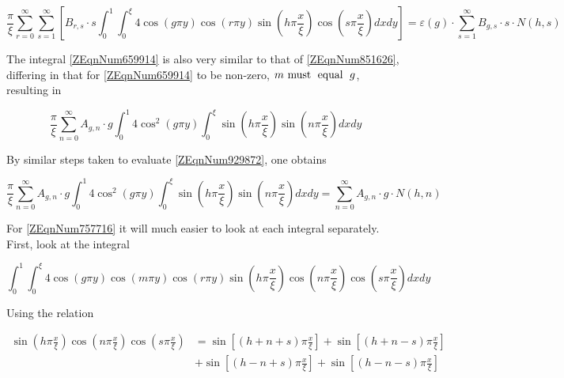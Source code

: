 \documentclass{article}
\begin{document}
\begin{equation} \label{3.30)} \frac{\pi }{\xi } \sum _{r=0}^{\infty } \sum
_{s=1}^{\infty } \left[B_{r,s} \cdot s\int _{0}^{1} \int _{0}^{\xi }4\cos
\left(g\pi y\right)\cos (r\pi y)\sin \left(h\pi \frac{x}{\xi } \right)\cos
\left(s\pi \frac{x}{\xi } \right)dxdy \right] =\varepsilon \left(g\right)\cdot
\sum _{s=1}^{\infty }B_{g,s} \cdot s\cdot N\left(h,s\right) \end{equation}

The integral \eqref{ZEqnNum659914} is also very similar to that of
\eqref{ZEqnNum851626}, differing in that for \eqref{ZEqnNum659914} to be
non-zero, $m \text{ must\; equal\; } g$, resulting in

\begin{equation} \label{3.31)} \frac{\pi }{\xi } \sum _{n=0}^{\infty }A_{g,n}
\cdot g\int _{0}^{1}4\cos ^{2} \left(g\pi y\right)\int _{0}^{\xi } \sin
\left(h\pi \frac{x}{\xi } \right)\sin \left(n\pi \frac{x}{\xi } \right) dxdy
\end{equation}

By similar steps taken to evaluate \eqref{ZEqnNum929872}, one obtains

\begin{equation} \label{3.32)} \frac{\pi }{\xi } \sum _{n=0}^{\infty }A_{g,n}
\cdot g\int _{0}^{1}4\cos ^{2} \left(g\pi y\right)\int _{0}^{\xi } \sin
\left(h\pi \frac{x}{\xi } \right)\sin \left(n\pi \frac{x}{\xi } \right)
dxdy=\sum _{n=0}^{\infty }A_{g,n} \cdot g\cdot N\left(h,n\right) \end{equation} 



For \eqref{ZEqnNum757716} it will much easier to look at each integral
separately. First, look at the integral

\begin{equation*}
    \int _{0}^{1} \int _{0}^{\xi }4\cos \left(g\pi y\right)\cos \left(m\pi
    y\right)\cos \left(r\pi y\right)\sin \left(h\pi \frac{x}{\xi } \right)\cos
    \left(n\pi \frac{x}{\xi } \right)\cos \left(s\pi \frac{x}{\xi } \right)dxdy 
\end{equation*}

Using the relation

\begin{equation*} \begin{split}
    \sin \left(h\pi \frac{x}{\xi } \right)\cos \left(n\pi
    \frac{x}{\xi } \right)\cos \left(s\pi \frac{x}{\xi } \right) 
    & = \sin \left[\left(h+n+s\right)\pi \frac{x}{\xi } \right]
    + \sin \left[\left(h+n-s\right)\pi \frac{x}{\xi } \right] \\ 
    & + \sin \left[\left(h-n+s\right)\pi \frac{x}{\xi } \right]
    +\sin \left[\left(h-n-s\right)\pi \frac{x}{\xi } \right]  
\end{split} \end{equation*}
\end{document}
